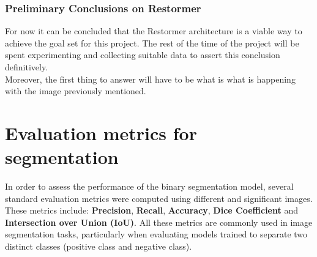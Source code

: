 \documentclass[openany, 12pt]{article}
\begin{document}
\subsubsection{Preliminary Conclusions on Restormer}
For now it can be concluded that the Restormer architecture is a viable way to achieve the goal set for this project. The rest of the time of the project will be spent experimenting and collecting suitable data to assert this conclusion definitively. \\
Moreover, the first thing to answer will have to be what is what is happening with the image previously mentioned.
\newpage
\section{Evaluation metrics for segmentation}
In order to assess the performance of the binary segmentation model, several standard evaluation metrics were computed using different and significant images. These metrics include: \textbf{Precision}, \textbf{Recall}, \textbf{Accuracy}, \textbf{Dice Coefficient} and \textbf{Intersection over Union (IoU)}. All these metrics are commonly used in image segmentation tasks, particularly when evaluating models trained to separate two distinct classes (positive class and negative class).
\end{document}
